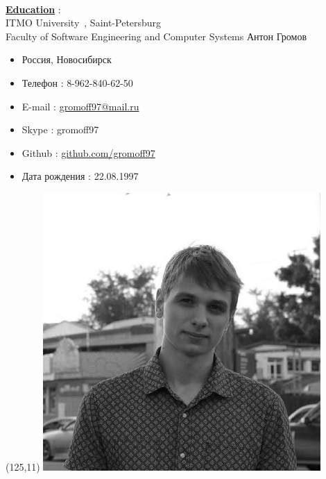 \documentclass[hidelinks,12pt,a4paper,oneside]{article}
\begin{document}
\ \\
{\Large \underline{\textbf{Education}}} : \\ [8px]
{\large
ITMO University\ , Saint-Petersburg \\
Faculty of Software Engineering and Computer Systems
}
\newpage
\thispagestyle{empty}
{ \LARGE Антон Громов }
\noindent{\rule{12cm}{0.5mm}}
{\large
\begin{itemize}[topsep=5pt, itemsep=-11pt]
	\item[] Россия, Новосибирск
	\item[] Телефон : 8-962-840-62-50
	\item[] E-mail : \href{mailto://gromoff97@mail.ru}{gromoff97@mail.ru}
	\item[] Skype : gromoff97
	\item[] Github : \href{https://github.com/gromoff97}{github.com/gromoff97}
	\item[] Дата рождения : 22.08.1997
\end{itemize}
}
   \begin{textblock}{20}(125,11)
      \includegraphics[scale=0.33]{myphoto.jpg}
    \end{textblock}
\end{document}
